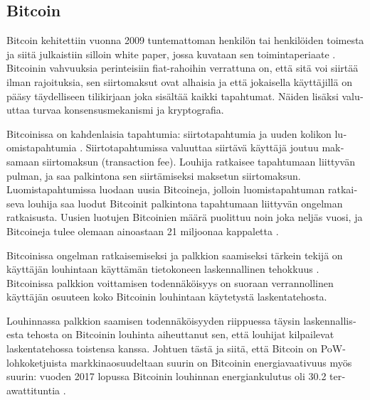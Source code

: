 \subsection{Bitcoin\label{bitcoin}}
\begin{otherlanguage}{english}

Bitcoin kehitettiin vuonna 2009 tuntemattoman henkilön tai henkilöiden toimesta ja siitä julkaistiin silloin white paper, jossa kuvataan sen toimintaperiaate \cite{bitcoin1, satoshibitcoin}. Bitcoinin vahvuuksia perinteisiin fiat-rahoihin verrattuna on, että sitä voi siirtää ilman rajoituksia, sen siirtomaksut ovat alhaisia ja että jokaisella käyttäjillä on pääsy täydelliseen tilikirjaan joka sisältää kaikki tapahtumat. Näiden lisäksi valuuttaa turvaa konsensusmekanismi ja kryptografia.

Bitcoinissa on kahdenlaisia tapahtumia: siirtotapahtumia ja uuden kolikon luomistapahtumia \cite{bitcoin1}. Siirtotapahtumissa valuuttaa siirtävä käyttäjä joutuu maksamaan siirtomaksun (transaction fee). Louhija ratkaisee tapahtumaan liittyvän pulman, ja saa palkintona sen siirtämiseksi maksetun siirtomaksun. Luomistapahtumissa luodaan uusia Bitcoineja, jolloin luomistapahtuman ratkaiseva louhija saa luodut Bitcoinit palkintona tapahtumaan liittyvän ongelman ratkaisusta. Uusien luotujen Bitcoinien määrä puolittuu noin joka neljäs vuosi, ja Bitcoineja tulee olemaan ainoastaan 21 miljoonaa kappaletta \cite{satoshibitcoin}.

Bitcoinissa ongelman ratkaisemiseksi ja palkkion saamiseksi tärkein tekijä on käyttäjän louhintaan käyttämän tietokoneen laskennallinen tehokkuus \cite{bitcoin1}. Bitcoinissa palkkion voittamisen todennäköisyys on suoraan verrannollinen käyttäjän osuuteen koko Bitcoinin louhintaan käytetystä laskentatehosta.

Louhinnassa palkkion saamisen todennäköisyyden riippuessa täysin laskennallisesta tehosta on Bitcoinin louhinta aiheuttanut sen, että louhijat kilpailevat laskentatehossa toistensa kanssa. Johtuen tästä ja siitä, että Bitcoin on PoW-lohkoketjuista markkinaosuudeltaan suurin on Bitcoinin energiavaativuus myös suurin: vuoden 2017 lopussa Bitcoinin louhinnan energiankulutus oli 30.2 terawattituntia \cite{bitcoinenergy1}. 


\end{otherlanguage}